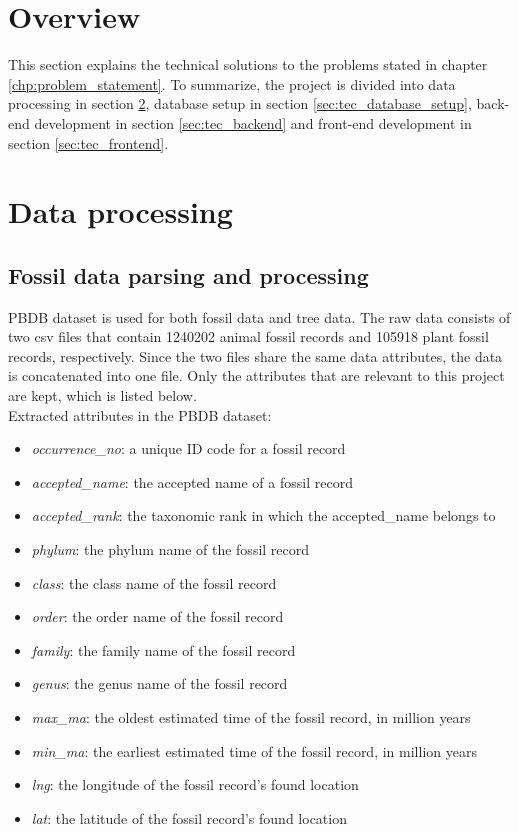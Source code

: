 \documentclass[11pt, a4paper,oneside,chapterprefix=false]{scrbook}
\begin{document}
\section{Overview}\label{sec:tec_overview}
This section explains the technical solutions to the problems stated in chapter \ref{chp:problem_statement}. To summarize, the project is divided into data processing in section \ref{sec:tec_data_processing}, database setup in section \ref{sec:tec_database_setup}, back-end development in section \ref{sec:tec_backend} and front-end development in section \ref{sec:tec_frontend}.

\section{Data processing} \label{sec:tec_data_processing}
\subsection{Fossil data parsing and processing} \label{subsec:fossil_data_processing}
PBDB dataset is used for both fossil data and tree data. The raw data consists of two csv files that contain 1240202 animal fossil records and 105918 plant fossil records, respectively. Since the two files share the same data attributes, the data is concatenated into one file. Only the attributes that are relevant to this project are kept, which is listed below.\\

\noindent Extracted attributes in the PBDB dataset:
\begin{itemize}
	\item \textit{occurrence\_no}: a unique ID code for a fossil record
	\item \textit{accepted\_name}: the accepted name of a fossil record
	\item \textit{accepted\_rank}: the taxonomic rank in which the accepted\_name belongs to 
	\item \textit{phylum}: the phylum name of the fossil record
	\item \textit{class}: the class name of the fossil record
	\item \textit{order}: the order name of the fossil record
	\item \textit{family}: the family name of the fossil record
	\item \textit{genus}: the genus name of the fossil record
	\item \textit{max\_ma}: the oldest estimated time of the fossil record, in million years
	\item \textit{min\_ma}: the earliest estimated time of the fossil record, in million years
	\item \textit{lng}: the longitude of the fossil record's found location 
	\item \textit{lat}: the latitude of the fossil record's found location 
	
\end{itemize}
\end{document}
